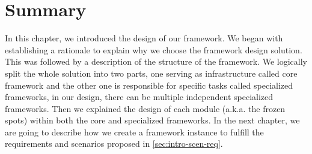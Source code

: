 \section{Summary}
\label{sec:fw-design-summary}

In this chapter, we introduced the design of our framework. We began with establishing a rationale to explain why
we choose the framework design solution. This was followed by a description of the 
structure of the framework. We logically split the whole solution into two parts,
one serving as infrastructure called core framework and the other one is
responsible for specific tasks called specialized frameworks, in our design,
there can be multiple independent specialized frameworks.
Then we explained the design of each module (a.k.a. the frozen spots) within both the
core and specialized frameworks. In the next chapter, we are going to describe
how we create a framework instance to fulfill the requirements and scenarios
proposed in \autoref{sec:intro-scen-req}.

